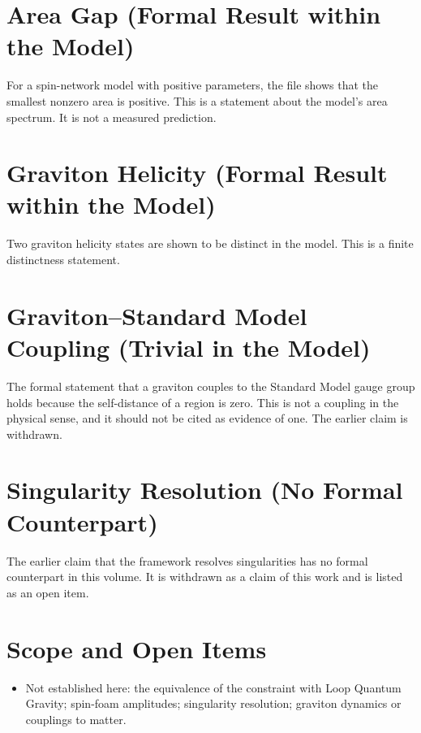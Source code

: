 \documentclass[11pt, a4paper]{article}
\begin{document}
\section{Area Gap (Formal Result within the Model)}
For a spin-network model with positive parameters, the file shows that the smallest nonzero area is positive. This is a statement about the model's area spectrum. It is not a measured prediction.

\section{Graviton Helicity (Formal Result within the Model)}
Two graviton helicity states are shown to be distinct in the model. This is a finite distinctness statement.

\section{Graviton--Standard Model Coupling (Trivial in the Model)}
The formal statement that a graviton couples to the Standard Model gauge group holds because the self-distance of a region is zero. This is not a coupling in the physical sense, and it should not be cited as evidence of one. The earlier claim is withdrawn.

\section{Singularity Resolution (No Formal Counterpart)}
The earlier claim that the framework resolves singularities has no formal counterpart in this volume. It is withdrawn as a claim of this work and is listed as an open item.

\section{Scope and Open Items}
\begin{itemize}
  \item Not established here: the equivalence of the constraint with Loop Quantum Gravity; spin-foam amplitudes; singularity resolution; graviton dynamics or couplings to matter.
\end{itemize}
\end{document}
